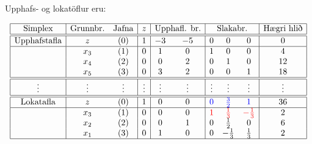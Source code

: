 \begin{daemi}Upphafs- og lokatöflur eru:
\begin{center}
{\renewcommand{\arraystretch}{1.5} \renewcommand{\tabcolsep}{0.2cm}
{\footnotesize
\[ \begin{array}{|c|cc|c|cc|ccc|c|}\hline 
\textrm{Simplex}& \textrm{Grunnbr.} & \textrm{Jafna} & z & \multicolumn{2}{c|}{\textrm{Upphafl. br.}} & \multicolumn{3}{c|}{\textrm{Slakabr.}} & \textrm{Hægri hlið} \\ \hline\hline
\textrm{Upphafstafla} & z & (0) & 1 & -3 & -5 & 0 & 0& 0 & 0 \\ \hline
 &  x_3 & (1) & 0 & 1 & 0 & 1 & 0 & 0 & 4 \\
 &  x_4 & (2) & 0 & 0 & 2 & 0 & 1 & 0 & 12 \\ 
 &  x_5 & (3) & 0 & 3 & 2 & 0 & 0 & 1 & 18 \\ \hline\hline
\vdots & \vdots & \vdots & \vdots & \vdots & \vdots & \vdots & \vdots & \vdots & \vdots \\ \hline \hline
\textrm{Lokatafla} & z & (0) & 1 & 0 & 0 & {\color{blue}{0}} &{\color{blue}{\frac{3}{2}}} & {\color{blue}{1}} & 36\\ \hline
 &  x_3 & (1) & 0 & 0 & 0 & \color{red}{1} & \color{red}{\frac{1}{3}} & \color{red}{-\frac{1}{3}} & 2 \\
 &  x_2 & (2) & 0 & 0 & 1 & 0 & \frac{1}{2} &  0 & 6 \\ 
 &  x_1 & (3) & 0 & 1 & 0 & 0 & -\frac{1}{3} & \frac{1}{3} & 2 \\ \hline
 \end{array}\]
}}
\end{center} 
\end{daemi}
